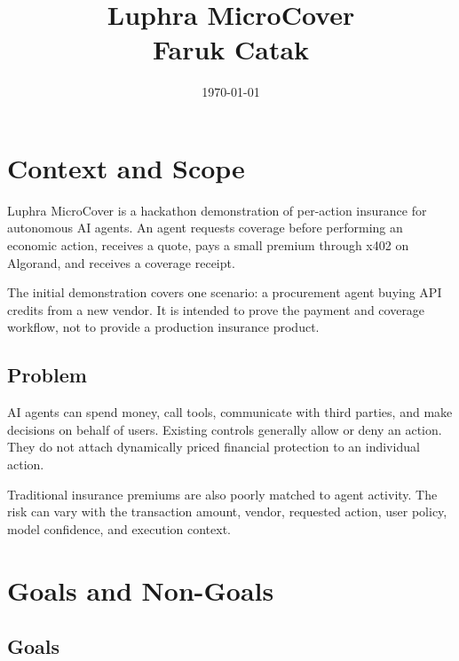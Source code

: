 \documentclass[11pt]{article}
\title{Luphra MicroCover\\
\large Faruk Catak}
\author{}
\date{\today}
\begin{document}
\maketitle
\tableofcontents
\newpage

\section{Context and Scope}

Luphra MicroCover is a hackathon demonstration of per-action insurance for
autonomous AI agents. An agent requests coverage before performing an economic
action, receives a quote, pays a small premium through x402 on Algorand, and
receives a coverage receipt.

The initial demonstration covers one scenario: a procurement agent buying API
credits from a new vendor. It is intended to prove the payment and coverage
workflow, not to provide a production insurance product.

\subsection{Problem}

AI agents can spend money, call tools, communicate with third parties, and make
decisions on behalf of users. Existing controls generally allow or deny an
action. They do not attach dynamically priced financial protection to an
individual action.

Traditional insurance premiums are also poorly matched to agent activity. The
risk can vary with the transaction amount, vendor, requested action, user
policy, model confidence, and execution context.

\section{Goals and Non-Goals}

\subsection{Goals}
\end{document}
